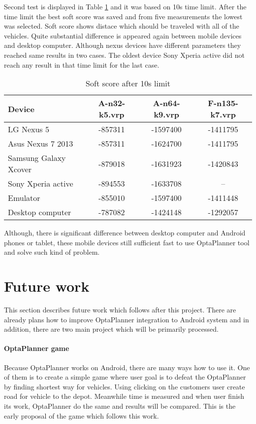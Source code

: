 Second test is displayed in Table \ref{ScoreLimitTable} and it was based on 10s time limit. After the time limit the
best soft score was saved and from five measurements the lowest was selected. Soft score shows distace which should be
traveled with all of the vehicles. Quite substantial difference is appeared again between mobile devices and desktop
computer. Although nexus devices have different parameters they reached same results in two cases. The oldest device
Sony Xperia active did not reach any result in that time limit for the last case.

\begin {table}[h!]
    \begin{tabular}{|l|c|c|c|}
        \hline
        \textbf{Device} &
        \textbf{A-n32-k5.vrp} &
        \textbf{A-n64-k9.vrp} &
        \textbf{F-n135-k7.vrp} \\ \hline \hline
        LG Nexus 5            & -857311 & -1597400 & -1411795 \\ \hline
        Asus Nexus 7 2013     & -857311 & -1624700 & -1411795 \\ \hline
        Samsung Galaxy Xcover & -879018 & -1631923 & -1420843 \\ \hline
        Sony Xperia active    & -894553 & -1633708 & --       \\ \hline
        Emulator              & -855010 & -1597400 & -1411448 \\ \hline
        Desktop computer      & -787082 & -1424148 & -1292057 \\ \hline
    \end{tabular}
    \centering
    \caption{Soft score after 10s limit}
    \label{ScoreLimitTable}
\end{table}

Although, there is significant difference between desktop computer and Android phones or tablet, these mobile devices
still sufficient fast to use OptaPlanner tool and solve such kind of problem.

\section{Future work}\label{FutureWorkSection}
This section describes future work which follows after this project. There are already plans how to improve OptaPlanner
integration to Android system and in addition, there are two main project which will be primarily processed.

\paragraph{OptaPlanner game}
Because OptaPlanner works on Android, there are many ways how to use it. One of them is to create a simple game where user
goal is to defeat the OptaPlanner by finding shortest way for vehicles. Using clicking on the customers user create road
for vehicle to the depot. Meanwhile time is measured and when user finish its work, OptaPlanner do the same and results
will be compared. This is the early proposal of the game which follows this work.

